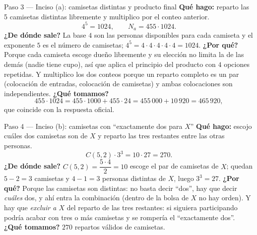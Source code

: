 \documentclass[11pt]{article}
\begin{document}
\begin{paso}{Paso 3 --- Inciso (a): camisetas distintas y producto final}
\textbf{Qué hago:} reparto las 5 camisetas distintas libremente y multiplico por el conteo anterior.
\[
4^5=1024,\qquad N_a=455\cdot 1024 .
\]
\textbf{¿De dónde sale?} La base $4$ son las personas disponibles para cada camiseta y el exponente $5$ es el número de camisetas; $4^5=4\cdot4\cdot4\cdot4\cdot4=1024$.
\textbf{¿Por qué?} Porque cada camiseta escoge dueño libremente y su elección no limita la de las demás (nadie tiene cupo), así que aplica el principio del producto con $4$ opciones repetidas. Y multiplico los dos conteos porque un reparto completo es un par (colocación de entradas, colocación de camisetas) y ambas colocaciones son independientes.
\textbf{¿Qué tomamos?}
\[
455\cdot 1024=455\cdot 1000+455\cdot 24=455\,000+10\,920=465\,920 ,
\]
que coincide con la respuesta oficial.
\end{paso}

\begin{paso}{Paso 4 --- Inciso (b): camisetas con ``exactamente dos para $X$''}
\textbf{Qué hago:} escojo cuáles dos camisetas son de $X$ y reparto las tres restantes entre las otras personas.
\[
C(5,2)\cdot 3^3=10\cdot 27=270 .
\]
\textbf{¿De dónde sale?} $C(5,2)=\dfrac{5\cdot4}{2}=10$ escoge el par de camisetas de $X$; quedan $5-2=3$ camisetas y $4-1=3$ personas distintas de $X$, luego $3^3=27$.
\textbf{¿Por qué?} Porque las camisetas son distintas: no basta decir ``dos'', hay que decir \emph{cuáles} dos, y ahí entra la combinación (dentro de la bolsa de $X$ no hay orden). Y hay que \emph{excluir a $X$} del reparto de las tres restantes: si siguiera participando podría acabar con tres o más camisetas y se rompería el ``exactamente dos''.
\textbf{¿Qué tomamos?} $270$ repartos válidos de camisetas.
\end{paso}
\end{document}
